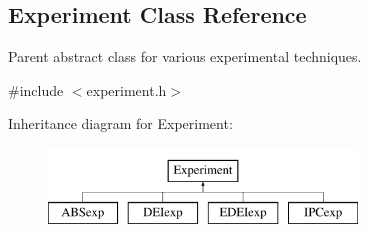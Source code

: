 \hypertarget{classExperiment}{
\subsection{Experiment Class Reference}
\label{classExperiment}
}


Parent abstract class for various experimental techniques.  




{\ttfamily \#include $<$experiment.h$>$}

Inheritance diagram for Experiment:\begin{figure}[H]
\begin{center}
\leavevmode
\includegraphics[height=2.000000cm]{classExperiment}
\end{center}
\end{figure}
